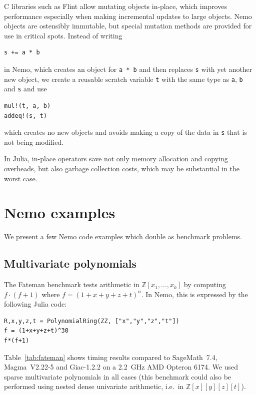 \documentclass{sig-alternate-05-2015}
\begin{document}
C libraries such as Flint allow mutating
objects in-place, which improves performance
especially when making incremental updates
to large objects.
Nemo objects are ostensibly immutable,
but special mutation methods
are provided for use in critical spots.
Instead of writing
\begin{small}
\begin{verbatim}
s += a * b
\end{verbatim}
\end{small}
in Nemo, which creates an object for \texttt{a * b}
and then replaces \texttt{s} with yet another new object, we
create a reusable scratch variable \texttt{t} with the same type as \texttt{a}, \texttt{b} and \texttt{s} and use
\begin{small}
\begin{verbatim}
mul!(t, a, b)
addeq!(s, t)
\end{verbatim}
\end{small}
which creates no new objects and avoids making a copy of the data in \texttt{s}
that is not being modified.

In Julia, in-place operators save not only memory allocation and copying
overheads, but also
garbage collection costs, which may be substantial in the worst case.

\section{Nemo examples}
\label{sect:nemo}

We present a few Nemo code examples which double as
benchmark problems.

\subsection{Multivariate polynomials}

The Fateman benchmark
tests arithmetic in $\mathbb{Z}[x_1,\ldots,x_k]$
by computing
$f \cdot (f+1)$ where $f = (1 + x + y + z + t)^n$. In Nemo,
this is expressed by the following Julia code:

\begin{small}
\begin{verbatim}
R,x,y,z,t = PolynomialRing(ZZ, ["x","y","z","t"])
f = (1+x+y+z+t)^30
f*(f+1)
\end{verbatim}
\end{small}

Table~\ref{tab:fateman} shows timing results compared to
SageMath~7.4, Magma~V2.22-5 and Giac-1.2.2
on a 2.2~GHz AMD Opteron 6174.
We used sparse multivariate polynomials in all
cases (this benchmark could also be performed
using nested dense univariate arithmetic, i.e.\ in $\mathbb{Z}[x][y][z][t]$).
\end{document}
